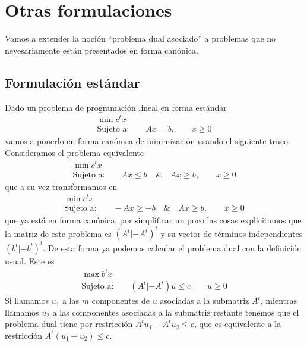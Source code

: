 \section{Otras formulaciones}
Vamos a extender la noción ``problema dual asociado'' a problemas que no nevesariamente están presentados en forma canónica.
\subsection{Formulación estándar}
Dado un problema de programación lineal en forma estándar
\begin{equation*}
\begin{array}{c}
\min c^tx\\
\text{Sujeto a:}\qquad Ax= b,\qquad x\geq 0
\end{array}
\end{equation*}
vamos a ponerlo en forma canónica de minimización usando el siguiente truco. Consideramos el problema equivalente
\begin{equation*}
\begin{array}{c}
\min c^tx\\
\text{Sujeto a:}\qquad Ax\leq b\quad \&\quad Ax\geq b,\qquad x\geq 0
\end{array}
\end{equation*}
que a su vez transformamos en
\begin{equation*}
\begin{array}{c}
\min c^tx\\
\text{Sujeto a:}\qquad -Ax\geq -b\quad \&\quad Ax\geq b,\qquad x\geq 0
\end{array}
\end{equation*}
que ya está en forma canónica, por simplificar un poco las cosas explicitamos que la matriz de este problema es $(A^t|-A^t)^t$ y su vector de términos independientes $(b^t|-b^t)^t$. De esta forma ya podemos calcular el problema dual con la definición usual. Este es
\begin{equation*}
\begin{array}{c}
\max b^tx\\
\text{Sujeto a:}\qquad(A^t|-A^t)u\leq c\qquad u\geq 0
\end{array}
\end{equation*}
Si llamamos $u_1$ a las $m$ componentes de $u$ asociadas a la submatriz $A^t$, mientras llamamos $u_2$ a las componentes asociadas a la submatriz restante tenemos que el problema dual tiene por restricción $A^tu_1-A^tu_2\leq c$, que es equivalente a la restricción $A^t(u_1-u_2)\leq c$.

